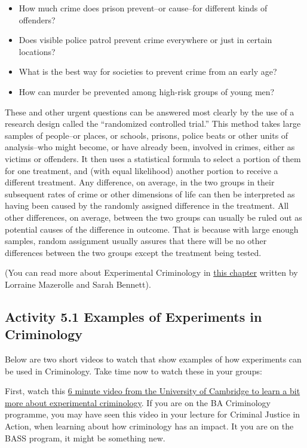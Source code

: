 \documentclass[
]{book}
\providecommand{\tightlist}{%
  \setlength{\itemsep}{0pt}\setlength{\parskip}{0pt}}
\begin{document}
\begin{itemize}
\tightlist
\item
  How much crime does prison prevent--or cause--for different kinds of offenders?
\item
  Does visible police patrol prevent crime everywhere or just in certain locations?
\item
  What is the best way for societies to prevent crime from an early age?
\item
  How can murder be prevented among high-risk groups of young men?
\end{itemize}

These and other urgent questions can be answered most clearly by the use of a research design called the ``randomized controlled trial.'' This method takes large samples of people--or places, or schools, prisons, police beats or other units of analysis--who might become, or have already been, involved in crimes, either as victims or offenders. It then uses a statistical formula to select a portion of them for one treatment, and (with equal likelihood) another portion to receive a different treatment. Any difference, on average, in the two groups in their subsequent rates of crime or other dimensions of life can then be interpreted as having been caused by the randomly assigned difference in the treatment. All other differences, on average, between the two groups can usually be ruled out as potential causes of the difference in outcome. That is because with large enough samples, random assignment usually assures that there will be no other differences between the two groups except the treatment being tested.

(You can read more about Experimental Criminology in \href{http://www.oxfordbibliographies.com/view/document/obo-9780195396607/obo-9780195396607-0085.xml}{this chapter} written by Lorraine Mazerolle and Sarah Bennett).

\hypertarget{activity-5.1-examples-of-experiments-in-criminology}{%
\subsection{Activity 5.1 Examples of Experiments in Criminology}\label{activity-5.1-examples-of-experiments-in-criminology}}

Below are two short videos to watch that show examples of how experiments can be used in Criminology. Take time now to watch these in your groups:

First, watch this \href{https://www.youtube.com/watch?v=IGDF1-B1Yjs\&feature=player_embedded}{6 minute video from the University of Cambridge to learn a bit more about experimental criminology}. If you are on the BA Criminology programme, you may have seen this video in your lecture for Criminal Justice in Action, when learning about how criminology has an impact. It you are on the BASS program, it might be something new.
\end{document}
